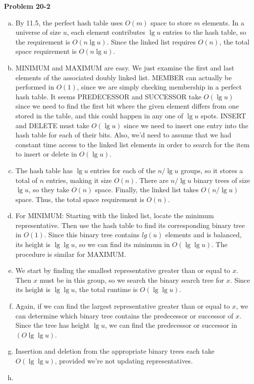 \documentclass{article}
\begin{document}
\noindent\textbf{Problem 20-2}\\
\begin{enumerate}[a)]
\item By 11.5, the perfect hash table uses $O(m)$ space to store $m$ elements.  In a universe of size $u$, each element contributes $\lg u$ entries to the hash table, so the requirement is $O(n\lg u)$.  Since the linked list requires $O(n)$, the total space requirement is $O(n\lg u)$. 

\item MINIMUM and MAXIMUM are easy.  We just examine the first and last elements of the associated doubly linked list. MEMBER can actually be performed in $O(1)$, since we are simply checking membership in a perfect hash table.  It seems PREDECESSOR and SUCCESSOR take $O(\lg u)$ since we need to find the first bit where the given element differs from one stored in the table, and this could happen in any one of $\lg u$ spots.  INSERT and DELETE must take $O(\lg u)$ since we need to insert one entry into the hash table for each of their bits.  Also, we'd need to assume that we had constant time access to the linked list elements in order to search for the item to insert or delete in $O(\lg u)$.  

\item The hash table has $\lg u$ entries for each of the $n/\lg u$ groups, so it stores a total of $n$ entries, making it size $O(n)$.  There are $n/\lg u$ binary trees of size $\lg u$, so they take $O(n)$ space.  Finally, the linked list takes $O(n/\lg u)$ space.  Thus, the total space requirement is $O(n)$. 

\item For MINIMUM:  Starting with the linked list, locate the minimum representative.  Then use the hash table to find its corresponding binary tree in $O(1)$.  Since this binary tree contains $lg(u)$ elements and is balanced, its height is $\lg \lg u$, so we can find its minimum in $O(\lg \lg u)$.  The procedure is similar for MAXIMUM. 

\item We start by finding the smallest representative greater than or equal to $x$. %
 Then $x$ must be in this group, so we search the binary search tree for $x$. Since its height is $\lg \lg u$, the total runtime is $O(\lg \lg u)$. 

\item Again, if we can find the largest representative greater than or equal to $x$, we can determine which binary tree contains the predecessor or successor of $x$.  Since the tree has height $\lg u$, we can find the predecessor or successor in $(O\lg \lg u)$. 

\item Insertion and deletion from the appropriate binary trees each take $O(\lg \lg u)$, provided we're not updating representatives. 

\item %
\end{enumerate}
\end{document}
